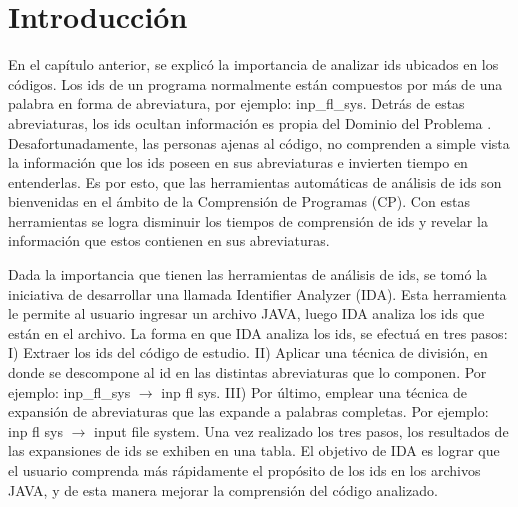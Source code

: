 \fancyhf{}
\pagestyle{fancy}
\lhead[]{\leftmark}
\chead[]{}
\rhead[]{\thepage}
\renewcommand{\headrulewidth}{1pt}

\section{Introducción}

En el capítulo anterior, se explicó la importancia de analizar ids ubicados en los códigos. Los ids de un programa normalmente están compuestos por más de una palabra en forma de abreviatura, por ejemplo: \textsf{inp\_fl\_sys}. Detrás de estas abreviaturas, los ids ocultan información es propia del Dominio del Problema \cite{BCPT99,LFBEX07,EZH08,EHPV09}. Desafortunadamente, las personas ajenas al código, no comprenden a simple vista la información que los ids poseen en sus abreviaturas e invierten tiempo en entenderlas. Es por esto, que las herramientas automáticas de análisis de ids son bienvenidas en el ámbito de la Comprensión de Programas (CP). Con estas herramientas se logra disminuir los tiempos de comprensión de ids y revelar la información que estos contienen en sus abreviaturas.

Dada la importancia que tienen las herramientas de análisis de ids, se tomó la iniciativa de desarrollar una llamada Identifier Analyzer (IDA). Esta herramienta le permite al usuario ingresar un archivo JAVA, luego IDA analiza los ids que están en el archivo.
La forma en que IDA analiza los ids, se efectuá en tres pasos: I) Extraer los ids del código de estudio. II) Aplicar una técnica de división, en donde se descompone al id en las distintas abreviaturas que lo componen. Por ejemplo: \textsf{inp\_fl\_sys} $\rightarrow$ \textsf{inp fl sys}. \linebreak III) Por último, emplear una técnica de expansión de abreviaturas que las expande a palabras completas. Por ejemplo: \textsf{inp fl sys} $\rightarrow$ \textsf{input file system}. Una vez realizado los tres pasos, los resultados de las expansiones de ids se exhiben en una tabla.
El objetivo de IDA es lograr que el usuario comprenda más rápidamente el propósito de los ids en los archivos JAVA, y de esta manera mejorar la comprensión del código analizado.


